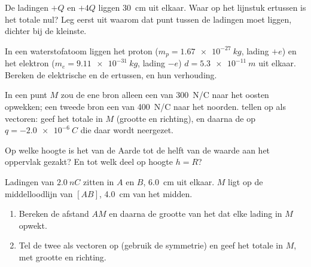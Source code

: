 \begin{exercise}[$\star\star$]\label{exo:g11:electric-gravitational-fields:9}
De ladingen $+Q$ en $+4Q$ liggen \qty{30}{cm} uit elkaar. Waar op het
lijnstuk ertussen is het totale  nul? Leg eerst uit waarom dat punt
tussen de ladingen moet liggen, dichter bij de kleinste.
\end{exercise}

\begin{exercise}[$\star\star$]\label{exo:g11:electric-gravitational-fields:10}
In een waterstofatoom liggen het proton ($m_p = \qty{1.67e-27}{kg}$,
lading $+e$) en het elektron ($m_e = \qty{9.11e-31}{kg}$, lading $-e$)
$d = \qty{5.3e-11}{m}$ uit elkaar. Bereken de elektrische  en de
 ertussen, en hun verhouding.
\end{exercise}

\begin{exercise}[$\star\star$]\label{exo:g11:electric-gravitational-fields:11}
In een punt $M$ zou de ene bron alleen een  van \qty{300}{N/C} naar
het oosten opwekken; een tweede bron een van \qty{400}{N/C} naar het
noorden.  tellen op als vectoren: geef het totale  in $M$
(grootte en richting), en daarna de  op
$q = \qty{-2.0e-6}{C}$ die daar wordt neergezet.
\end{exercise}

\begin{exercise}[$\star\star\star$]\label{exo:g11:electric-gravitational-fields:12}
Op welke hoogte is het  van de Aarde tot de helft van de waarde aan
het oppervlak gezakt? En tot welk deel op hoogte $h = R$?
\end{exercise}

\begin{exercise}[$\star\star\star$]\label{exo:g11:electric-gravitational-fields:13}
Ladingen van $\qty{+2.0}{nC}$ zitten in $A$ en $B$, \qty{6.0}{cm} uit
elkaar. $M$ ligt op de middelloodlijn van $[AB]$, \qty{4.0}{cm} van het
midden.
\begin{enumerate}
  \item Bereken de afstand $AM$ en daarna de grootte van het  dat
        elke lading in $M$ opwekt.
  \item Tel de twee  als vectoren op (gebruik de symmetrie) en geef
        het totale  in $M$, met grootte en richting.
\end{enumerate}
\end{exercise}


